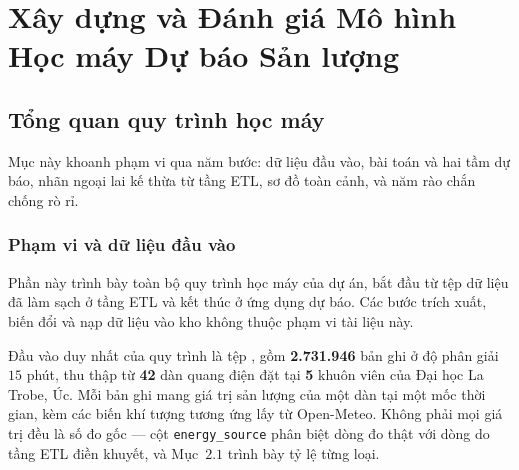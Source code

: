 \documentclass[12pt, a4paper]{report}
\begin{document}
\newpage
\setcounter{topnumber}{3}
\setcounter{bottomnumber}{2}
\setcounter{totalnumber}{4}
\renewcommand{\topfraction}{0.92}
\renewcommand{\bottomfraction}{0.7}
\renewcommand{\textfraction}{0.06}
\renewcommand{\floatpagefraction}{0.85}

\chapter{Xây dựng và Đánh giá Mô hình Học máy Dự báo Sản lượng}
\label{chap:forecasting}

%

\FloatBarrier
\section{Tổng quan quy trình học máy}

Mục này khoanh phạm vi qua năm bước: dữ liệu đầu vào, bài toán và hai tầm dự báo, nhãn
ngoại lai kế thừa từ tầng ETL, sơ đồ toàn cảnh, và năm rào chắn chống rò rỉ.

\FloatBarrier
\subsection{Phạm vi và dữ liệu đầu vào}

Phần này trình bày toàn bộ quy trình học máy của dự án, bắt đầu từ tệp dữ liệu đã
làm sạch ở tầng ETL và kết thúc ở ứng dụng dự báo. Các bước trích xuất, biến đổi và
nạp dữ liệu vào kho không thuộc phạm vi tài liệu này.

Đầu vào duy nhất của quy trình là tệp ,
gồm \textbf{2.731.946} bản ghi ở độ phân giải $15$ phút, thu thập từ \textbf{42} dàn
quang điện đặt tại \textbf{5} khuôn viên của Đại học La Trobe, Úc. Mỗi bản ghi mang
giá trị sản lượng của một dàn tại một mốc thời gian, kèm các biến khí tượng tương ứng lấy từ
Open-Meteo. Không phải mọi giá trị đều là số đo gốc --- cột \texttt{energy\_source} phân biệt dòng
đo thật với dòng do tầng ETL điền khuyết, và Mục~$2.1$ trình bày tỷ lệ từng loại.
\end{document}
